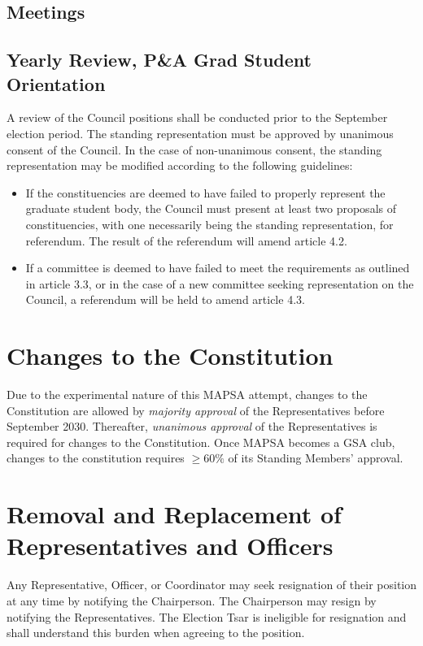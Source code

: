\documentclass[8pt]{article}
\begin{document}
	\subsection{Meetings}
	
	\subsection{Yearly Review, P\&A Grad Student Orientation}
	A review of the Council positions shall be conducted prior to the September election period. The standing representation must be approved by unanimous consent of the Council. In the case of non-unanimous consent, the standing representation may be modified according to the following guidelines:
	\begin{itemize}
		\item If the constituencies are deemed to have failed to properly represent the graduate student body, the Council must present at least two proposals of constituencies, with one necessarily being the standing representation, for referendum. The result of the referendum will amend article 4.2.
		\item If a committee is deemed to have failed to meet the requirements as outlined in article 3.3, or in the case of a new committee seeking representation on the Council, a referendum will be held to amend article 4.3.
	\end{itemize}
	\section{Changes to the Constitution}
	Due to the experimental nature of this MAPSA attempt, changes to the Constitution are allowed by \textit{majority approval} of the Representatives before September 2030. Thereafter, \textit{unanimous approval} of the Representatives is required for changes to the Constitution. Once MAPSA becomes a GSA club, changes to the constitution requires $\geq 60\%$ of its Standing Members' approval.
	
	\section{Removal and Replacement of Representatives and Officers}
	Any Representative, Officer, or Coordinator may seek resignation of their position at any time by notifying the Chairperson. The Chairperson may resign by notifying the Representatives. The Election Tsar is ineligible for resignation and shall understand this burden when agreeing to the position.
\end{document}
